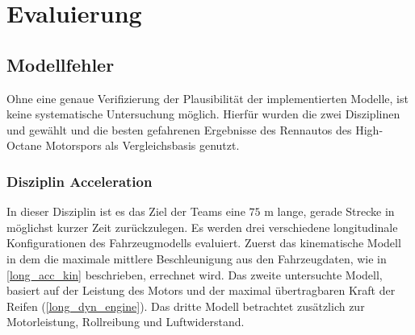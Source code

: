 \documentclass{like}
\begin{document}
\chapter{Evaluierung}
\section{Modellfehler}
\label{modelError}
Ohne eine genaue Verifizierung der Plausibilität der implementierten Modelle, ist keine systematische Untersuchung möglich. Hierfür wurden die zwei Disziplinen  und  gewählt und die besten gefahrenen Ergebnisse des Rennautos des High-Octane Motorspors als Vergleichsbasis genutzt.


\subsection{Disziplin Acceleration}
In dieser Disziplin ist es das Ziel der Teams eine $75$ m lange, gerade Strecke in möglichst kurzer Zeit zurückzulegen.
Es werden drei verschiedene longitudinale Konfigurationen des Fahrzeugmodells evaluiert. Zuerst das kinematische Modell in dem die maximale mittlere Beschleunigung aus den Fahrzeugdaten, wie in \ref{long_acc_kin} beschrieben, errechnet wird. Das zweite untersuchte Modell, basiert auf der Leistung des Motors und der maximal übertragbaren Kraft der Reifen (\ref{long_dyn_engine}).
Das dritte Modell betrachtet zusätzlich zur Motorleistung, Rollreibung und Luftwiderstand. 
\end{document}
